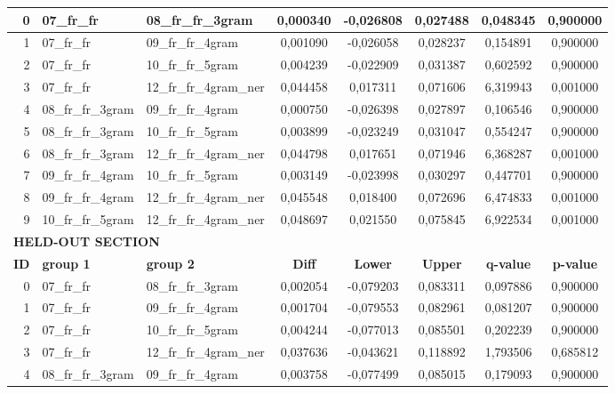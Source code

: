 \begin{table}[h!]
\begin{tabular}{|r|l|l||c|c|c|c|c|}
        0 & 07\_fr\_fr & 08\_fr\_fr\_3gram & 0,000340 & -0,026808 & 0,027488 & 0,048345 & 0,900000 \\ \hline
        1 & 07\_fr\_fr & 09\_fr\_fr\_4gram & 0,001090 & -0,026058 & 0,028237 & 0,154891 & 0,900000 \\ \hline
        2 & 07\_fr\_fr & 10\_fr\_fr\_5gram & 0,004239 & -0,022909 & 0,031387 & 0,602592 & 0,900000 \\ \hline
        3 & 07\_fr\_fr & 12\_fr\_fr\_4gram\_ner & 0,044458 & 0,017311 & 0,071606 & 6,319943 & 0,001000 \\ \hline
        4 & 08\_fr\_fr\_3gram & 09\_fr\_fr\_4gram & 0,000750 & -0,026398 & 0,027897 & 0,106546 & 0,900000 \\ \hline
        5 & 08\_fr\_fr\_3gram & 10\_fr\_fr\_5gram & 0,003899 & -0,023249 & 0,031047 & 0,554247 & 0,900000 \\ \hline
        6 & 08\_fr\_fr\_3gram & 12\_fr\_fr\_4gram\_ner & 0,044798 & 0,017651 & 0,071946 & 6,368287 & 0,001000 \\ \hline
        7 & 09\_fr\_fr\_4gram & 10\_fr\_fr\_5gram & 0,003149 & -0,023998 & 0,030297 & 0,447701 & 0,900000 \\ \hline
        8 & 09\_fr\_fr\_4gram & 12\_fr\_fr\_4gram\_ner & 0,045548 & 0,018400 & 0,072696 & 6,474833 & 0,001000 \\ \hline
        9 & 10\_fr\_fr\_5gram & 12\_fr\_fr\_4gram\_ner & 0,048697 & 0,021550 & 0,075845 & 6,922534 & 0,001000 \\ \hline\hline
        \multicolumn{8}{|l|}{\textbf{HELD-OUT SECTION}} \\ \hline\hline
        \textbf{ID} & \textbf{group 1} & \textbf{group 2} & \textbf{Diff} & \textbf{Lower} & \textbf{Upper} & \textbf{q-value} & \textbf{p-value} \\ \hline
        0 & 07\_fr\_fr & 08\_fr\_fr\_3gram & 0,002054 & -0,079203 & 0,083311 & 0,097886 & 0,900000 \\ \hline
        1 & 07\_fr\_fr & 09\_fr\_fr\_4gram & 0,001704 & -0,079553 & 0,082961 & 0,081207 & 0,900000 \\ \hline
        2 & 07\_fr\_fr & 10\_fr\_fr\_5gram & 0,004244 & -0,077013 & 0,085501 & 0,202239 & 0,900000 \\ \hline
        3 & 07\_fr\_fr & 12\_fr\_fr\_4gram\_ner & 0,037636 & -0,043621 & 0,118892 & 1,793506 & 0,685812 \\ \hline
        4 & 08\_fr\_fr\_3gram & 09\_fr\_fr\_4gram & 0,003758 & -0,077499 & 0,085015 & 0,179093 & 0,900000 \\ \hline

\end{tabular}
\end{table}
